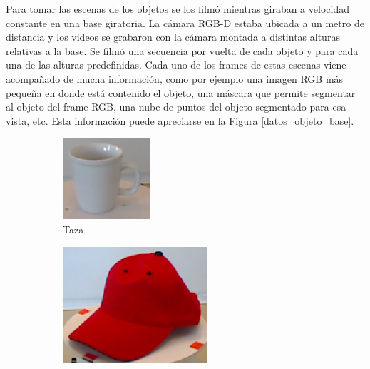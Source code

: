 Para tomar las escenas de los objetos se los filmó mientras giraban a velocidad constante en una base giratoria. La cámara RGB-D estaba ubicada a un metro de distancia y los videos se grabaron con la cámara montada a distintas alturas relativas a la base. Se filmó una secuencia por vuelta de cada objeto y para cada una de las alturas predefinidas. Cada uno de los frames de estas escenas viene acompañado de mucha información, como por ejemplo una imagen RGB más pequeña en donde está contenido el objeto, una máscara que permite segmentar al objeto del frame RGB, una nube de puntos del objeto segmentado para esa vista, etc. Esta información puede apreciarse en la Figura \ref{datos_objeto_base}.

\begin{figure}
    \centering
    \begin{subfigure}[b]{0.4\textwidth}
        \includegraphics[width=\textwidth]{img/base_rgbd/crop.png}
        \caption{Taza}
		\label{fig:taza}
    \end{subfigure}
    \quad
    \begin{subfigure}[b]{0.4\textwidth}
        \includegraphics[width=\textwidth]{img/base_rgbd/gorra.png}

\end{subfigure}
\end{figure}
